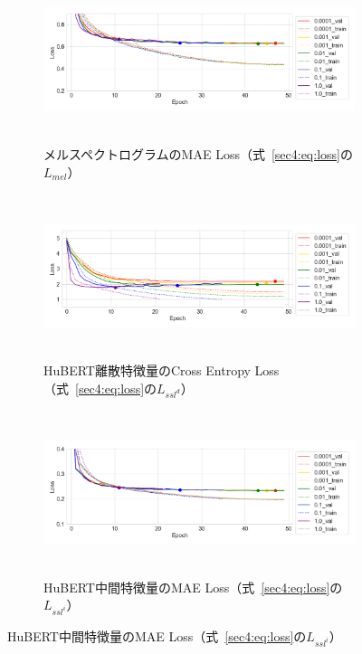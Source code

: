 \documentclass[12pt]{jarticle}
\numberwithin{equation}{section}    %
\numberwithin{figure}{section}      %
\numberwithin{table}{section}      %
\begin{document}
\begin{figure}[bt]
    \centering
    \begin{subfigure}{\linewidth}
        \centering
        \includegraphics[height=48mm]{./figure/sec4/learning_curves/1/mel_loss.png}
        \caption{メルスペクトログラムのMAE Loss（式~\eqref{sec4:eq:loss}の$L_{mel}$）}
        \label{sec4:fig:learning_curve_method_1_proposed_val_mel_loss}
    \end{subfigure}
    \begin{subfigure}{\linewidth}
        \centering
        \includegraphics[height=48mm]{./figure/sec4/learning_curves/1/ssl_feature_cluster_loss.png}
        \caption{HuBERT離散特徴量のCross Entropy Loss（式~\eqref{sec4:eq:loss}の$L_{ssl^{d}}$）}
        \label{sec4:fig:learning_curve_method_1_proposed_val_ssl_feature_cluster_loss}
    \end{subfigure}
    \begin{subfigure}{\linewidth}
        \centering
        \includegraphics[height=48mm]{./figure/sec4/learning_curves/1/ssl_conv_feature_loss.png}
        \caption{HuBERT中間特徴量のMAE Loss（式~\eqref{sec4:eq:loss}の$L_{ssl^{i}}$）}

\end{subfigure}
\end{figure}
\end{document}
